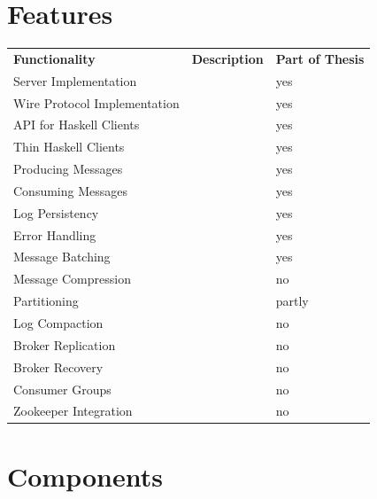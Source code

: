 \section{Features}
\begin{table}[h]
\begin{tabular}{lll}
\textbf{Functionality}       & \textbf{Description} & \textbf{Part of Thesis} \\
Server Implementation        &                      & yes                     \\
Wire Protocol Implementation &                      & yes                     \\
API for Haskell Clients      &                      & yes                     \\
Thin Haskell Clients         &                      & yes                     \\
Producing Messages           &                      & yes                     \\
Consuming Messages           &                      & yes                     \\
Log Persistency              &                      & yes                     \\
Error Handling               &                      & yes                     \\
Message Batching             &                      & yes                     \\
Message Compression          &                      & no                      \\
Partitioning                 &                      & partly                  \\
Log Compaction               &                      & no                      \\
Broker Replication           &                      & no                      \\
Broker Recovery              &                      & no                      \\
Consumer Groups              &                      & no                      \\
Zookeeper Integration        &                      & no                     
\end{tabular}
\end{table}

\section{Components}

